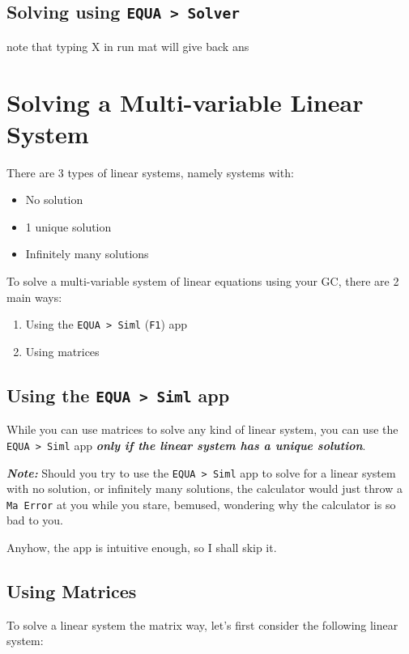 \documentclass[a5paper,draft]{memoir}
\def\code#1{\texttt{#1}}
\def\note#1{\textbf{\textit{Note:}} #1}
\begin{document}
\subsection{Solving using \code{EQUA > Solver}}

note that typing X in run mat will give back ans

\section{Solving a Multi-variable Linear System}
There are 3 types of linear systems, namely systems with:
\begin{itemize}
	\item No solution
	\item 1 unique solution
	\item Infinitely many solutions
\end{itemize}

To solve a multi-variable system of linear equations using your GC, there are 2 main ways:
\begin{enumerate}
	\item Using the \code{EQUA > Siml} (\code{F1}) app
	\item Using matrices
\end{enumerate}

\subsection{Using the \code{EQUA > Siml} app}
While you can use matrices to solve any kind of linear system, you can use the \code{EQUA > Siml} app \textit{\textbf{only if the linear system has a unique solution}}.

\note{Should you try to use the \code{EQUA > Siml} app to solve for a linear system with no solution, or infinitely many solutions, the calculator would just throw a \code{Ma Error} at you while you stare, bemused, wondering why the calculator is so bad to you.}

Anyhow, the app is intuitive enough, so I shall skip it.

\subsection{Using Matrices}

To solve a linear system the matrix way, let's first consider the following linear system:
\begin{center}
\end{center}
\end{document}

